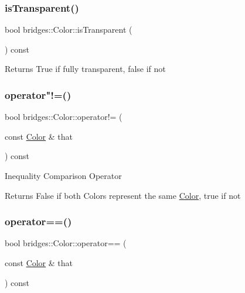\subsubsection{\texorpdfstring{isTransparent()}{isTransparent()}}
{\footnotesize\ttfamily bool bridges\+::\+Color\+::is\+Transparent (\begin{DoxyParamCaption}{ }\end{DoxyParamCaption}) const\hspace{0.3cm}{\ttfamily [inline]}}

\begin{DoxyReturn}{Returns}
True if fully transparent, false if not 
\end{DoxyReturn}
\mbox{\label{classbridges_1_1_color_abe4ff1e5d4c6a33b2e9715be57ae0dce}} 
\subsubsection{\texorpdfstring{operator"!=()}{operator!=()}}
{\footnotesize\ttfamily bool bridges\+::\+Color\+::operator!= (\begin{DoxyParamCaption}\item[{const \mbox{\hyperlink{classbridges_1_1_color}{Color}} \&}]{that }\end{DoxyParamCaption}) const\hspace{0.3cm}{\ttfamily [inline]}}

Inequality Comparison Operator \begin{DoxyReturn}{Returns}
False if both Colors represent the same \mbox{\hyperlink{classbridges_1_1_color}{Color}}, true if not 
\end{DoxyReturn}
\mbox{\label{classbridges_1_1_color_a9b33b4ee063496691f8816504cc8b007}} 
\subsubsection{\texorpdfstring{operator==()}{operator==()}}
{\footnotesize\ttfamily bool bridges\+::\+Color\+::operator== (\begin{DoxyParamCaption}\item[{const \mbox{\hyperlink{classbridges_1_1_color}{Color}} \&}]{that }\end{DoxyParamCaption}) const\hspace{0.3cm}{\ttfamily [inline]}}

